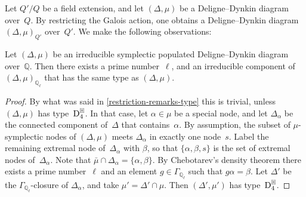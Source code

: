 \documentclass[10pt,twoside,leqno]{article}
\numberwithin{equation}{subsection}
\newcommand{\QQ}{\mathbb{Q}}
\newcommand{\QQl}{\QQ_{\ell}}
\newcommand{\RR}{\mathbb{R}}
\newcommand{\HQ}{\mathbb{H}}
\newcommand{\DtD}{\textnormal{D}}
\begin{document}
\begin{remark} %
 \label{restriction-remarks}
 Let $Q'/Q$ be a field extension,
 and let $(\Delta,\mu)$ be a Deligne--Dynkin diagram over~$Q$.
 By restricting the Galois action,
 one obtains a Deligne--Dynkin diagram $(\Delta,\mu)_{Q'}$ over~$Q'$.
 We make the following observations:
\end{remark}

\begin{lemma} %
 \label{locally-same-type}
 Let $(\Delta,\mu)$ be
 an irreducible symplectic populated Deligne--Dynkin diagram over~$\QQ$.
 Then there exists a prime number~$\ell$,
 and an irreducible component of $(\Delta,\mu)_{\QQl}$
 that has the same type as $(\Delta,\mu)$.
 \begin{proof}
  By what was said in \cref{restriction-remarks-type} this is trivial,
  unless $(\Delta,\mu)$ has type~$\DtD_4^\HQ$.
  In that case, let $\alpha \in \mu$ be a special node,
  and let $\Delta_\alpha$ be
  the connected component of~$\Delta$ that contains~$\alpha$.
  By assumption, the subset of $\mu$-symplectic nodes of $(\Delta,\mu)$
  meets $\Delta_\alpha$ in exactly one node~$s$.
  Label the remaining extremal node of~$\Delta_\alpha$ with $\beta$,
  so that $\{\alpha,\beta,s\}$ is the set of extremal nodes of~$\Delta_\alpha$.
  Note that $\bar\mu \cap \Delta_\alpha = \{\alpha,\beta\}$.
  By Chebotarev's density theorem
  there exists a prime number~$\ell$
  and an element $g \in \Gamma_{\QQl}$ such that $g\alpha = \beta$.
  Let $\Delta'$ be the $\Gamma_{\QQl}$-closure of $\Delta_\alpha$,
  and take $\mu' = \Delta' \cap \mu$.
  Then $(\Delta', \mu')$ has type~$\DtD_4^\HQ$.
 \end{proof}
\end{lemma}
\end{document}
